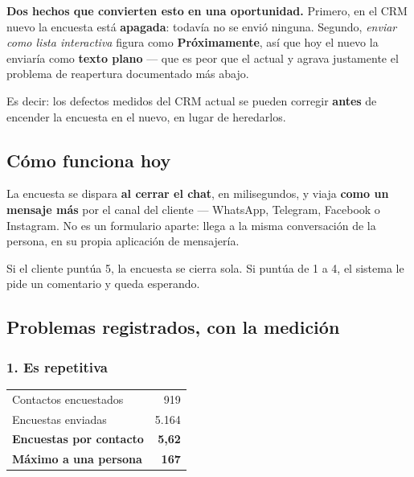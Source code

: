 \documentclass[11pt,a4paper]{article}
\begin{document}
\begin{nota}
\textbf{Dos hechos que convierten esto en una oportunidad.} Primero, en el CRM nuevo la
encuesta está \textbf{apagada}: todavía no se envió ninguna. Segundo, \emph{enviar como
lista interactiva} figura como \textbf{Próximamente}, así que hoy el nuevo la enviaría
como \textbf{texto plano} --- que es peor que el actual y agrava justamente el problema
de reapertura documentado más abajo.

\vspace{0.4em}
Es decir: los defectos medidos del CRM actual se pueden corregir \textbf{antes} de
encender la encuesta en el nuevo, en lugar de heredarlos.
\end{nota}

\subsection{Cómo funciona hoy}

La encuesta se dispara \textbf{al cerrar el chat}, en milisegundos, y viaja
\textbf{como un mensaje más} por el canal del cliente --- WhatsApp, Telegram, Facebook o
Instagram. No es un formulario aparte: llega a la misma conversación de la persona, en
su propia aplicación de mensajería.

Si el cliente puntúa 5, la encuesta se cierra sola. Si puntúa de 1 a 4, el sistema le
pide un comentario y queda esperando.

\subsection{Problemas registrados, con la medición}

\subsubsection*{1. Es repetitiva}

\begin{center}
\begin{tabular}{@{}lr@{}}
\toprule
Contactos encuestados          & 919 \\
Encuestas enviadas             & 5.164 \\
\textbf{Encuestas por contacto}& \textbf{5,62} \\
\textbf{Máximo a una persona}  & \textbf{167} \\
\bottomrule
\end{tabular}
\end{center}
\end{document}
